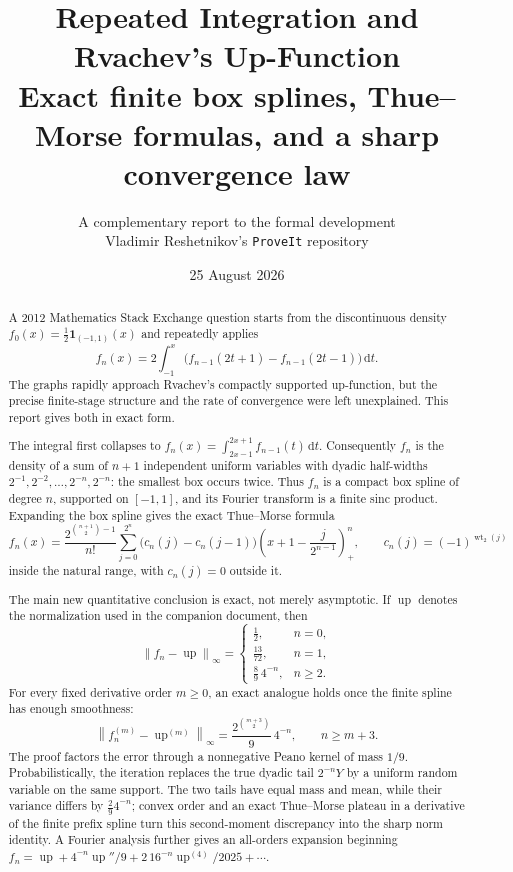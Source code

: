 \documentclass[11pt,oneside]{article}
\title{\bfseries Repeated Integration and Rvachev's Up-Function\\[0.35em]
\large Exact finite box splines, Thue--Morse formulas, and a sharp convergence law}
\author{A complementary report to the formal development\\
\small Vladimir Reshetnikov's \texttt{ProveIt} repository}
\date{25 August 2026}
\theoremstyle{definition}
\theoremstyle{remark}
\newcommand{\Up}{\operatorname{up}}
\newcommand{\wt}{\operatorname{wt}_2}
\newcommand{\dd}{\,\mathrm d}
\newcommand{\norm}[1]{\left\lVert #1\right\rVert}
\newcommand{\pos}[1]{\left(#1\right)_{+}}
\begin{document}
\maketitle

\begin{abstract}
A 2012 Mathematics Stack Exchange question starts from the discontinuous density
$f_0(x)=\tfrac12\mathbf 1_{(-1,1)}(x)$ and repeatedly applies
\[
 f_n(x)=2\int_{-1}^{x}\bigl(f_{n-1}(2t+1)-f_{n-1}(2t-1)\bigr)\dd t.
\]
The graphs rapidly approach Rvachev's compactly supported up-function, but the precise
finite-stage structure and the rate of convergence were left unexplained.  This report gives
both in exact form.

The integral first collapses to
$f_n(x)=\int_{2x-1}^{2x+1}f_{n-1}(t)\dd t$.  Consequently $f_n$ is the density of a sum of
$n+1$ independent uniform variables with dyadic half-widths
$2^{-1},2^{-2},\ldots,2^{-n},2^{-n}$: the smallest box occurs twice.  Thus $f_n$ is a compact
box spline of degree $n$, supported on $[-1,1]$, and its Fourier transform is a finite sinc
product.  Expanding the box spline gives the exact Thue--Morse formula
\[
 f_n(x)=\frac{2^{\binom{n+1}{2}-1}}{n!}
 \sum_{j=0}^{2^n}\bigl(c_n(j)-c_n(j-1)\bigr)
 \pos{x+1-\frac{j}{2^{n-1}}}^{n},
 \qquad c_n(j)=(-1)^{\wt(j)}
\]
inside the natural range, with $c_n(j)=0$ outside it.

The main new quantitative conclusion is exact, not merely asymptotic.  If $\Up$ denotes the
normalization used in the companion document, then
\[
 \norm{f_n-\Up}_{\infty}=
 \begin{cases}
  \tfrac12,&n=0,\\[0.15em]
  \tfrac{13}{72},&n=1,\\[0.15em]
  \tfrac89\,4^{-n},&n\ge2.
 \end{cases}
\]
For every fixed derivative order $m\ge0$, an exact analogue holds once the finite spline has
enough smoothness:
\[
 \norm{f_n^{(m)}-\Up^{(m)}}_{\infty}
 =\frac{2^{\binom{m+3}{2}}}{9}\,4^{-n},\qquad n\ge m+3.
\]
The proof factors the error through a nonnegative Peano kernel of mass $1/9$.  Probabilistically,
the iteration replaces the true dyadic tail $2^{-n}Y$ by a uniform random variable on the same
support.  The two tails have equal mass and mean, while their variance differs by
$\frac{2}{9}4^{-n}$; convex order and an exact Thue--Morse plateau in a derivative of the finite
prefix spline turn this second-moment discrepancy into the sharp norm identity.  A Fourier
analysis further gives an all-orders expansion beginning
$f_n=\Up+4^{-n}\Up''/9+2\,16^{-n}\Up^{(4)}/2025+\cdots$.
\end{abstract}
\end{document}
